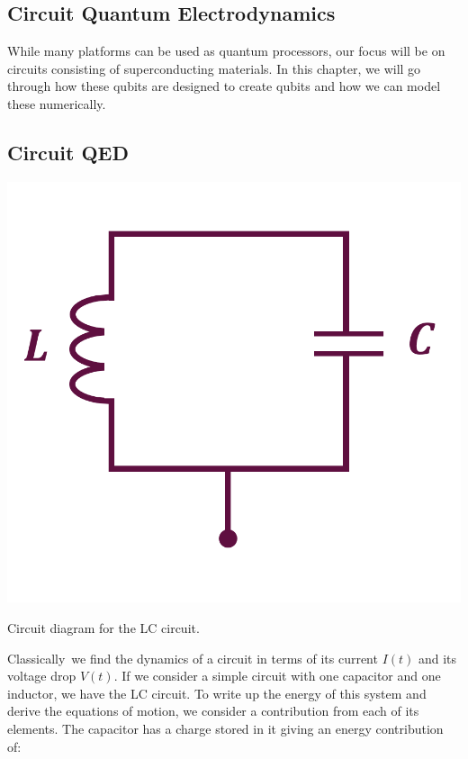 \begin{fullwidth}
\chapter{Circuit Quantum Electrodynamics}\label{chap:cQED}
\end{fullwidth}
While many platforms can be used as quantum processors, our focus will be on circuits consisting of superconducting materials. In this chapter, we will go through how these qubits are designed to create qubits and how we can model these numerically. \\

\section{Circuit QED}
\begin{marginfigure}[5 cm]
    \includegraphics[width = \linewidth]{tex/fig_for_text/LC_circuit.png}
    \caption{Circuit diagram for the LC circuit.}
\end{marginfigure}
Classically\, we find the dynamics of a circuit in terms of its current $I(t)$ and its voltage drop $V(t)$. If we consider a simple circuit with one capacitor and one inductor, we have the LC circuit. To write up the energy of this system and derive the equations of motion, we consider a contribution from each of its elements. The capacitor has a charge stored in it giving an energy contribution of:
